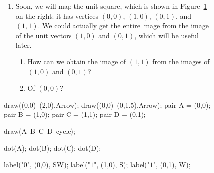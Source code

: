 \documentclass[../gatm.tex]{subfiles}
\begin{document}
\begin{figure}[h]
	\begin{center}
		\begin{minipage}[c]{0.55\textwidth}
			\begin{enumerate}
				\setcounter{enumi}{\value{mp_problem_i}}
				\item Soon, we will map the unit square, which is shown in Figure~\ref{fig:unit_square} on the right: it has vertices $(0,0)$, $(1,0)$, $(0,1)$, and $(1,1)$. We could actually get the entire image from the image of the unit vectors $(1,0)$ and $(0,1)$, which will be useful later. %
				\begin{enumerate}
					\item How can we obtain the image of $(1,1)$ from the images of $(1,0)$ and $(0,1)$?
					\item Of $(0,0)$?
				\end{enumerate}
				\setcounter{mp_problem_i}{\value{enumi}}
			\end{enumerate}
		\end{minipage}
		\hfill
		\begin{minipage}[c]{0.35\textwidth}
			\begin{center}
				\begin{minipage}[b]{\textwidth}
					\centering
					\begin{asy}[width=0.7\textwidth]
					draw((0,0)--(2,0),Arrow);
					draw((0,0)--(0,1.5),Arrow);
					pair A = (0,0);
					pair B = (1,0);
					pair C = (1,1);
					pair D = (0,1);
					
					draw(A--B--C--D--cycle);
					
					dot(A);
					dot(B);
					dot(C);
					dot(D);
					
					label("$0$", (0,0), SW);
					label("$1$", (1,0), S);
					label("$1$", (0,1), W);
					\end{asy}
				\end{minipage}
			\end{center}
			\vspace*{-2\baselineskip}
			\begin{center}
				\begin{minipage}[t]{\textwidth}
					\label{fig:unit_square}
				\end{minipage}
			\end{center}
		\end{minipage}
	\end{center}
\end{figure}
\end{document}
